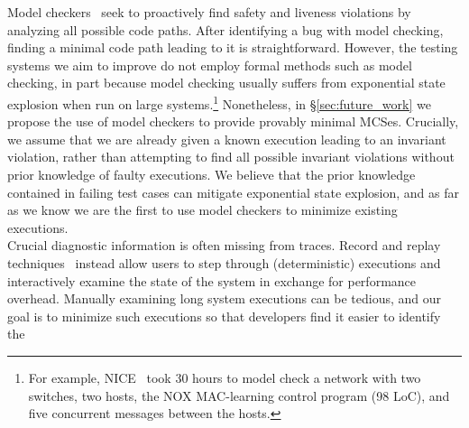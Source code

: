 %
Model checkers~\cite{musuvathi2008finding,nice} seek to
proactively find safety and liveness violations by analyzing all possible code paths.
After identifying a bug with model checking, finding a minimal code path leading to it is
straightforward. However, the testing systems we aim to improve do not employ
formal methods such as model checking, in part because model checking usually suffers from exponential
state explosion when run on large systems.\footnote{For example, NICE~\cite{nice} took 30 hours to
model check a network with two switches, two hosts, the NOX MAC-learning
control program (98 LoC), and five concurrent
messages between the hosts.} Nonetheless, in \S\ref{sec:future_work} we propose the
use of model checkers to provide provably
minimal MCSes. Crucially, we assume that we are already given a known
execution leading to an invariant violation, rather than attempting to find all
possible invariant violations without prior knowledge of faulty executions. We
believe that the prior knowledge contained in failing test cases can mitigate exponential
state explosion, and as far as we know we are the first to use model checkers
to minimize existing executions.\\[0.5ex]
%
 Crucial diagnostic information is often missing from traces.
Record and replay
techniques~\cite{Geels:2006:RDD:1267359.1267386,lin2013defined,Zamfir:2010:EST:1755913.1755946,Yuan:2010:SED:1736020.1736038}
instead allow users to step through (deterministic) executions and interactively examine the
state of the system in exchange for performance overhead.
Manually examining long system executions can be tedious, and our goal is to
minimize such executions so that developers find it easier to identify the
